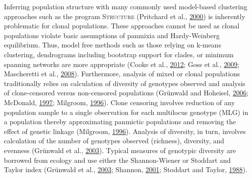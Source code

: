 \documentclass[double,12pt]{beavtex}
\begin{document}
  Inferring population structure with many commonly used model-based
  clustering approaches such as the program \textsc{Structure} (Pritchard
  et al., \protect\hyperlink{ref-pritchard2000inference}{2000}) is
  inherently problematic for clonal populations. These approaches cannot
  be used as clonal populations violate basic assumptions of panmixia and
  Hardy-Weinberg equilibrium. Thus, model free methods such as those
  relying on k-means clustering, dendrograms including bootstrap support
  for clades, or minimum spanning networks are more appropriate (Cooke et
  al., \protect\hyperlink{ref-cooke2012genome}{2012}; Goss et al.,
  \protect\hyperlink{ref-goss2009population}{2009}; Mascheretti et al.,
  \protect\hyperlink{ref-mascheretti2008reconstruction}{2008}).
  Furthermore, analysis of mixed or clonal populations traditionally
  relies on calculation of diversity of genotypes observed and analysis of
  clone-censored versus non-censored populations (Grünwald and Hoheisel,
  \protect\hyperlink{ref-grunwald2006hierarchical}{2006}; McDonald,
  \protect\hyperlink{ref-mcdonald1997population}{1997}; Milgroom,
  \protect\hyperlink{ref-milgroom1996recombination}{1996}). Clone
  censoring involves reduction of any population sample to a single
  observation for each multilocus genotype (MLG) in a population thereby
  approximating panmictic populations and removing the effect of genetic
  linkage (Milgroom,
  \protect\hyperlink{ref-milgroom1996recombination}{1996}). Analysis of
  diversity, in turn, involves calculation of the number of genotypes
  observed (richness), diversity, and evenness (Grünwald et al.,
  \protect\hyperlink{ref-grunwald2003analysis}{2003}). Typical measures of
  genotypic diversity are borrowed from ecology and use either the
  Shannon-Wiener or Stoddart and Taylor index (Grünwald et al.,
  \protect\hyperlink{ref-grunwald2003analysis}{2003}; Shannon,
  \protect\hyperlink{ref-shannon2001mathematical}{2001}; Stoddart and
  Taylor, \protect\hyperlink{ref-stoddart1988genotypic}{1988}).
  
\end{document}
